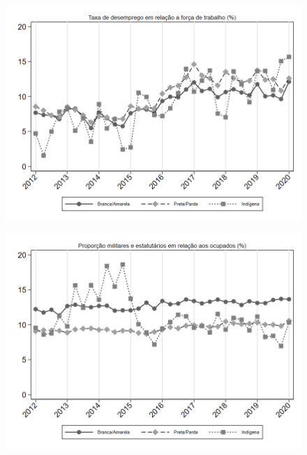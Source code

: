 \begin{frame}[label=_composicao_demografica_raca_taxa_de_desemprego]{}
\textit{\hyperlink{_composicao_demografica_raca}{}}
\begin{figure}
  \centering
  \includegraphics[width=1.0\linewidth]{../../analysis/output/composicao_demografica/raca/_composicao_demografica_raca_taxa_de_desemprego.png}
  \caption{}
  \label{fig:_composicao_demografica_raca_taxa_de_desemprego}
\end{figure}
\end{frame}

\begin{frame}[label=_composicao_demografica_raca_prop_militar]{}
\textit{\hyperlink{_composicao_demografica_raca}{}}
\begin{figure}
  \centering
  \includegraphics[width=1.0\linewidth]{../../analysis/output/composicao_demografica/raca/_composicao_demografica_raca_prop_militar.png}
  \caption{}
  \label{fig:_composicao_demografica_raca_prop_militar}
\end{figure}
\end{frame}


